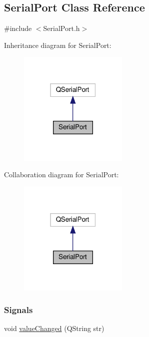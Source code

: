 \hypertarget{classSerialPort}{}\subsection{Serial\+Port Class Reference}
\label{classSerialPort}


{\ttfamily \#include $<$Serial\+Port.\+h$>$}



Inheritance diagram for Serial\+Port\+:\nopagebreak
\begin{figure}[H]
\begin{center}
\leavevmode
\includegraphics[width=147pt]{classSerialPort__inherit__graph}
\end{center}
\end{figure}


Collaboration diagram for Serial\+Port\+:\nopagebreak
\begin{figure}[H]
\begin{center}
\leavevmode
\includegraphics[width=147pt]{classSerialPort__coll__graph}
\end{center}
\end{figure}
\subsubsection*{Signals}
\begin{DoxyCompactItemize}
\item 
void \hyperlink{classSerialPort_a7313923f2de05683b56acce7c3bac7ff}{value\+Changed} (Q\+String str)
\end{DoxyCompactItemize}
